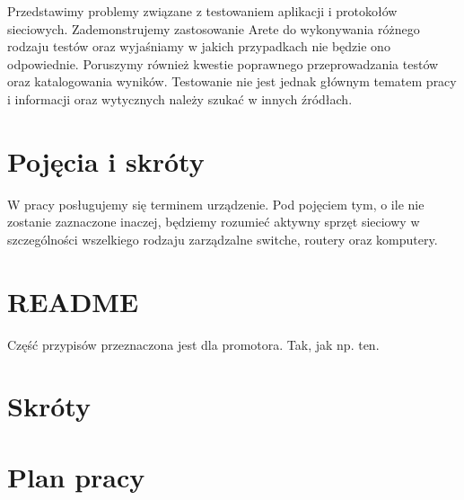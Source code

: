 \documentclass[00-praca-magisterska.tex]{subfiles}
\begin{document}
Przedstawimy problemy związane z testowaniem aplikacji i protokołów sieciowych.
Zademonstrujemy zastosowanie Arete do wykonywania różnego rodzaju testów oraz
wyjaśniamy w jakich przypadkach nie będzie ono odpowiednie.  Poruszymy również
kwestie poprawnego przeprowadzania testów oraz katalogowania wyników.
Testowanie nie jest jednak głównym tematem pracy i informacji oraz wytycznych
należy szukać w innych źródłach.


\section{Pojęcia i skróty}

W pracy posługujemy się terminem urządzenie. Pod pojęciem tym, o ile nie
zostanie zaznaczone inaczej, będziemy rozumieć aktywny sprzęt sieciowy w
szczególności wszelkiego rodzaju zarządzalne switche, routery oraz komputery.


\section{README}

Część przypisów przeznaczona jest dla promotora. Tak, jak np. ten.



\section {Skróty}


\section{Plan pracy}

\end{document}

